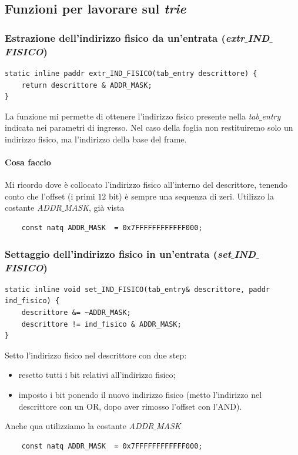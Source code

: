 \documentclass[11pt]{report}
\theoremstyle{definition}
\begin{document}
\subsection{Funzioni per lavorare sul \emph{trie}}

\subsubsection{Estrazione dell'indirizzo fisico da un'entrata (\emph{extr$\_$IND$\_$FISICO})}
\small 
\begin{verbatim}
static inline paddr extr_IND_FISICO(tab_entry descrittore) {
    return descrittore & ADDR_MASK;
}
\end{verbatim}
\normalsize 
La funzione mi permette di ottenere l'indirizzo fisico presente nella \emph{tab$\_$entry} indicata nei parametri di ingresso. Nel caso della foglia non restituiremo solo un indirizzo fisico, ma l'indirizzo della base del frame.
\paragraph{Cosa faccio} Mi ricordo dove è collocato l'indirizzo fisico all'interno del descrittore, tenendo conto che l'offset (i primi $12$ bit) è sempre una sequenza di zeri. Utilizzo la costante \emph{ADDR$\_$MASK}, già vista
\begin{verbatim}
	const natq ADDR_MASK  = 0x7FFFFFFFFFFFF000;
\end{verbatim}
\subsubsection{Settaggio dell'indirizzo fisico in un'entrata (\emph{set$\_$IND$\_$FISICO})}
\small 
\begin{verbatim}
static inline void set_IND_FISICO(tab_entry& descrittore, paddr ind_fisico) {
    descrittore &= ~ADDR_MASK;
    descrittore != ind_fisico & ADDR_MASK;
}
\end{verbatim}
\normalsize 
Setto l'indirizzo fisico nel descrittore con due step:
\begin{itemize}
	\item resetto tutti i bit relativi all'indirizzo fisico;
	\item imposto i bit ponendo il nuovo indirizzo fisico (metto l'indirizzo nel descrittore con un OR, dopo aver rimosso l'offset con l'AND).
\end{itemize}
Anche qua utilizziamo la costante \emph{ADDR$\_$MASK}
\begin{verbatim}
	const natq ADDR_MASK  = 0x7FFFFFFFFFFFF000;
\end{verbatim}
\end{document}
